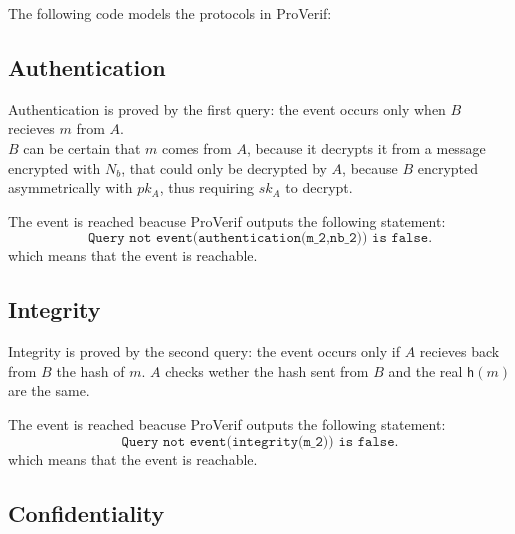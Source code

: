 The following code models the protocols in ProVerif:



\subsection{Authentication}
Authentication is proved by the first query: the event occurs only when $B$ recieves $m$ from $A$. \\
$B$ can be certain that $m$ comes from $A$, because it decrypts it from a message encrypted with $N_b$, that could only be decrypted by $A$, because $B$ encrypted asymmetrically with $pk_A$, thus requiring $sk_A$ to decrypt.

\noindent
The event is reached beacuse ProVerif outputs the following statement:
$$
\texttt{Query not event(authentication(m\_2,nb\_2)) is false.}
$$
which means that the event is reachable.

\subsection{Integrity}
Integrity is proved by the second query: the event occurs only if $A$ recieves back from $B$ the hash of $m$. $A$ checks wether the hash sent from $B$ and the real $\mathsf{h}(m)$ are the same.

\noindent
The event is reached beacuse ProVerif outputs the following statement:
$$
\texttt{Query not event(integrity(m\_2)) is false.}
$$
which means that the event is reachable.

\subsection{Confidentiality}
